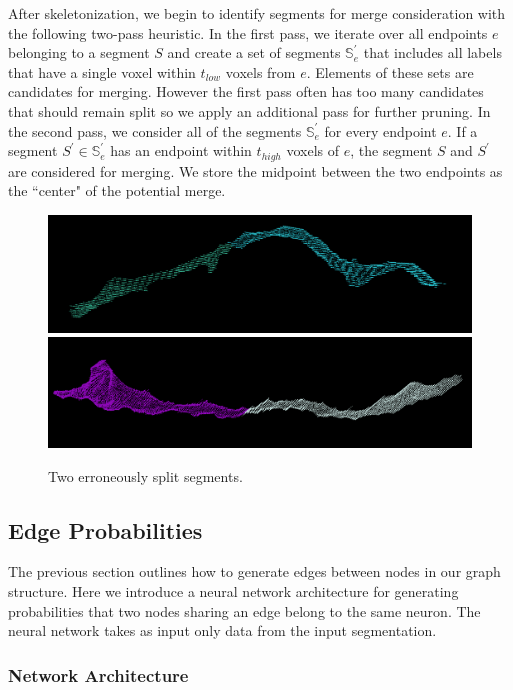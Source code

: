 After skeletonization, we begin to identify segments for merge consideration with the following two-pass heuristic.
In the first pass, we iterate over all endpoints $e$ belonging to a segment $S$ and create a set of segments $\mathbb{S}_e^\prime$ that includes all labels that have a single voxel within $t_{low}$ voxels from $e$. 
Elements of these sets are candidates for merging.
However the first pass often has too many candidates that should remain split so we apply an additional pass for further pruning.
In the second pass, we consider all of the segments $\mathbb{S}_e^\prime$ for every endpoint $e$. 
If a segment $S^\prime \in \mathbb{S}_e^\prime$ has an endpoint within $t_{high}$ voxels of $e$, the segment $S$ and $S^\prime$ are considered for merging. 
We store the midpoint between the two endpoints as the ``center" of the potential merge.

\begin{figure}[t]
	\centering
	\includegraphics[width=0.92\linewidth]{./figures/split_error1.png}
	\includegraphics[width=0.92\linewidth]{./figures/split_error2.png}
	\caption{Two erroneously split segments.}
	\label{fig:merge_candidates}
\end{figure}


\subsection{Edge Probabilities}

The previous section outlines how to generate edges between nodes in our graph structure. 
Here we introduce a neural network architecture for generating probabilities that two nodes sharing an edge belong to the same neuron. 
The neural network takes as input only data from the input segmentation. 

\subsubsection{Network Architecture}

